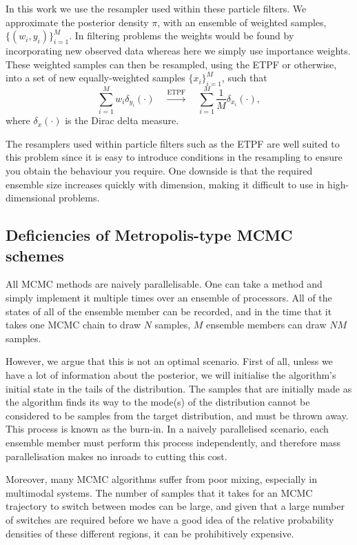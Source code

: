 \documentclass[final]{siamltex}
\newcommand{\revised}{}
\begin{document}
In this work we use the resampler used within these particle filters. We
approximate the posterior {\revised density $\pi$, with an ensemble
of weighted samples,} $\{(w_i,y_i)\}_{i=1}^M$. In filtering problems
the weights would be found by incorporating new observed data whereas
here we simply use importance weights. These weighted samples can then be resampled, using the ETPF or otherwise,
into a {\revised set of new equally-weighted samples $\{x_i\}_{i=1}^M$, such that
\begin{equation}\label{eqn:resampler}
	\sum\limits_{i=1}^M \! w_i\delta_{y_i}(\cdot)
	 \quad \xrightarrow{\text{ETPF}} \quad \sum\limits_{i=1}^M \!
	 \frac{1}{M} \delta_{x_i}(\cdot),
\end{equation}}
{\revised where $\delta_{x}(\cdot)$ is the Dirac delta measure.}

The resamplers used within particle filters such as the ETPF are well suited to this problem
since it is easy to introduce conditions in the resampling to ensure
you obtain the behaviour you require. One downside is that the
required ensemble size increases quickly with dimension, making it
difficult to use in high-dimensional problems.


\subsection{Deficiencies of Metropolis-type MCMC schemes}
All MCMC methods are naively parallelisable. One can take a method
and simply implement it multiple times over an ensemble of processors. All
of the states of all of the ensemble member can be recorded, and in the time
that it takes one MCMC chain to draw $N$ samples, $M$ ensemble members
can draw $NM$ samples. 

However, we argue that this is not an optimal
scenario. First of all, unless we have a lot of information about the
posterior, we will initialise the algorithm's initial state in the
tails of the distribution. The samples that are initially made as the
algorithm finds its way to the mode(s) of the distribution cannot be
considered to be samples from the target distribution, and must be thrown
away. This process is known as the burn-in. In a naively parallelised
scenario, each ensemble member must perform this process independently,
and therefore mass parallelisation makes no inroads to cutting this cost.

Moreover, many MCMC algorithms suffer from poor mixing, especially in
multimodal systems. The number of samples that it takes for an MCMC
trajectory to switch between modes can be large, and given that a large
number of switches are required before we have a good idea of the relative
probability densities of these different regions, it can be prohibitively
expensive.
\end{document}
